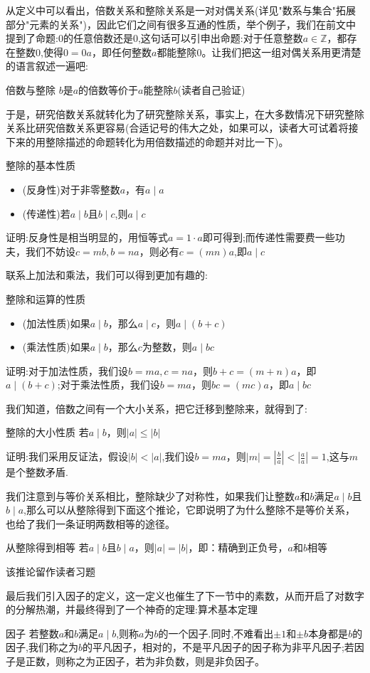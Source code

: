 从定义中可以看出，倍数关系和整除关系是一对对偶关系(详见"数系与集合"拓展部分"元素的关系")，因此它们之间有很多互通的性质，举个例子，我们在前文中提到了命题:$0$的任意倍数还是$0$,这句话可以引申出命题:对于任意整数$a\in \mathbb{Z}$，都存在整数$0$,使得$0=0a$，即任何整数$a$都能整除$0$。让我们把这一组对偶关系用更清楚的语言叙述一遍吧:
\begin{exercise}{倍数与整除}
$b$是$a$的倍数等价于$a$能整除$b$(读者自己验证)
\end{exercise}

于是，研究倍数关系就转化为了研究整除关系，事实上，在大多数情况下研究整除关系比研究倍数关系更容易(合适记号的伟大之处，如果可以，读者大可试着将接下来的用整除描述的命题转化为用倍数描述的命题并对比一下)。

\begin{example}{整除的基本性质}
\begin{itemize}
\item (反身性)对于非零整数$a$，有$a\mid a$
\item (传递性)若$a\mid b$且$b\mid c$,则$a\mid c$
\end{itemize}
\end{example}
证明:反身性是相当明显的，用恒等式$a=1\cdot a$即可得到;而传递性需要费一些功夫，我们不妨设$c=mb,b=na$，则必有$c=(mn)a$,即$a\mid c$

联系上加法和乘法，我们可以得到更加有趣的:

\begin{example}{整除和运算的性质}
\begin{itemize}
\item (加法性质)如果$a\mid b$，那么$a\mid c$，则$a\mid (b+c)$
\item (乘法性质)如果$a\mid b$，那么$c$为整数，则$a\mid bc$
\end{itemize}
\end{example}
证明:对于加法性质，我们设$b=ma,c=na$，则$b+c=(m+n)a$，即$a\mid (b+c)$;对于乘法性质，我们设$b=ma$，则$bc=(mc)a$，即$a\mid bc$

我们知道，倍数之间有一个大小关系，把它迁移到整除来，就得到了:

\begin{example}{整除的大小性质}
若$a\mid b$，则$|a|\le |b|$
\end{example}
证明:我们采用反证法，假设$|b|<|a|$,我们设$b=ma$，则$|m|=|\frac{b}{a}|<|\frac{a}{a}|=1$,这与$m$是个整数矛盾.

我们注意到与等价关系相比，整除缺少了对称性，如果我们让整数$a$和$b$满足$a\mid b$且$b\mid a$,那么可以从整除得到下面这个推论，它即说明了为什么整除不是等价关系，也给了我们一条证明两数相等的途径。
\begin{corollary}{从整除得到相等}
若$a\mid b$且$b\mid a$，则$|a|=|b|$，即：精确到正负号，$a$和$b$相等
\end{corollary}
该推论留作读者习题

最后我们引入因子的定义，这一定义也催生了下一节中的素数，从而开启了对数字的分解热潮，并最终得到了一个神奇的定理:算术基本定理

\begin{definition}{因子}
若整数$a$和$b$满足$a\mid b$,则称$a$为$b$的一个因子.同时,不难看出$\pm 1$和$\pm b$本身都是$b$的因子,我们称之为$b$的平凡因子，相对的，不是平凡因子的因子称为非平凡因子;若因子是正数，则称之为正因子，若为非负数，则是非负因子。
\end{definition}